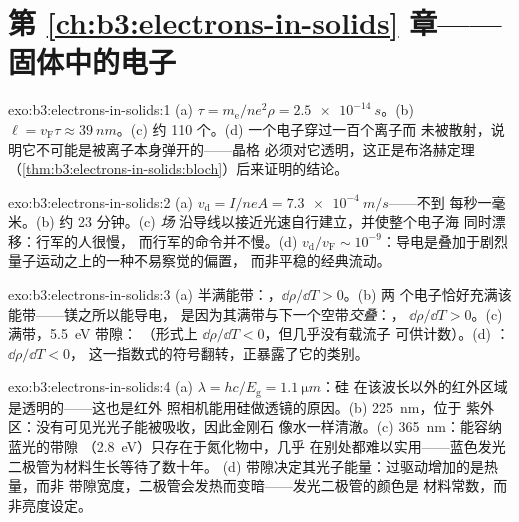 \section*{第 \ref{ch:b3:electrons-in-solids} 章——固体中的电子}

\begin{solution}{exo:b3:electrons-in-solids:1}
(a) $\tau = m_{\text{e}}/ne^2\rho = \qty{2.5e-14}{s}$。(b) $\ell =
v_{\text{F}}\tau \approx \qty{39}{nm}$。(c) 约 110 个。(d) 一个电子穿过一百个离子而
未被散射，说明它不可能是被离子本身弹开的——晶格
必须对它透明，这正是布洛赫定理
（\cref{thm:b3:electrons-in-solids:bloch}）后来证明的结论。
\end{solution}

\begin{solution}{exo:b3:electrons-in-solids:2}
(a) $v_{\text{d}} = I/neA = \qty{7.3e-4}{m/s}$——不到
每秒一毫米。(b) 约 23 分钟。(c) \emph{场}
沿导线以接近光速自行建立，并使整个电子海
同时漂移：行军的人很慢，
而行军的命令并不慢。(d) $v_{\text{d}}/v_{\text{F}} \sim
10^{-9}$：导电是叠加于剧烈量子运动之上的一种不易察觉的偏置，
而非平稳的经典流动。
\end{solution}

\begin{solution}{exo:b3:electrons-in-solids:3}
(a) 半满能带：，$\dd\rho/\dd T > 0$。(b) 两
个电子恰好充满该能带——镁之所以能导电，
是因为其满带与下一个空带\emph{交叠}：，
$\dd\rho/\dd T > 0$。(c) 满带，\qty{5.5}{eV} 带隙：
（形式上 $\dd\rho/\dd T < 0$，但几乎没有载流子
可供计数）。(d) ：$\dd\rho/\dd T < 0$，
这一指数式的符号翻转，正暴露了它的类别。
\end{solution}

\begin{solution}{exo:b3:electrons-in-solids:4}
(a) $\lambda = hc/E_{\text{g}} = \qty{1.1}{\micro m}$：硅
在该波长以外的红外区域是透明的——这也是红外
照相机能用硅做透镜的原因。(b) \qty{225}{nm}，位于
紫外区：没有可见光光子能被吸收，因此金刚石
像水一样清澈。(c) \qty{365}{nm}：能容纳蓝光的带隙
（\qty{2.8}{eV}）只存在于氮化物中，几乎
在别处都难以实用——蓝色发光二极管为材料生长等待了数十年。
(d) 带隙决定其光子能量：过驱动增加的是热量，而非
带隙宽度，二极管会发热而变暗——发光二极管的颜色是
材料常数，而非亮度设定。
\end{solution}

